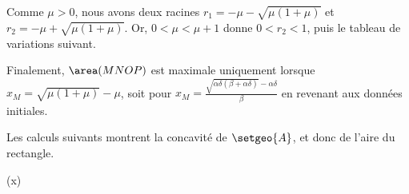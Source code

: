 Comme $\mu > 0$, nous avons deux racines
$r_1 = - \mu - \sqrt{\mu (1 + \mu)}$
et
$r_2 = - \mu + \sqrt{\mu (1 + \mu)}$.
Or,
$0 < \mu < \mu + 1$
donne
$0 < r_2 < 1$,
puis
le tableau de variations suivant.
%
\begin{center}
\end{center}


Finalement,
$\area(MNOP)$ est maximale uniquement lorsque 
$x_M = \sqrt{\mu (1 + \mu)} - \mu$,
soit pour %
$x_M = \frac{\sqrt{ \alpha \delta (\beta +  \alpha \delta)} - \alpha \delta}{\beta}$
en revenant aux données initiales.


\begin{remark}
	Les calculs suivants montrent la concavité de $\setgeo{A}$, et donc de l'aire du rectangle.

	\begin{stepcalc}[style=sar]
    	(x)
    \explnext{}
    \explnext{}
    \explnext{}
    \end{stepcalc}
\end{remark}
